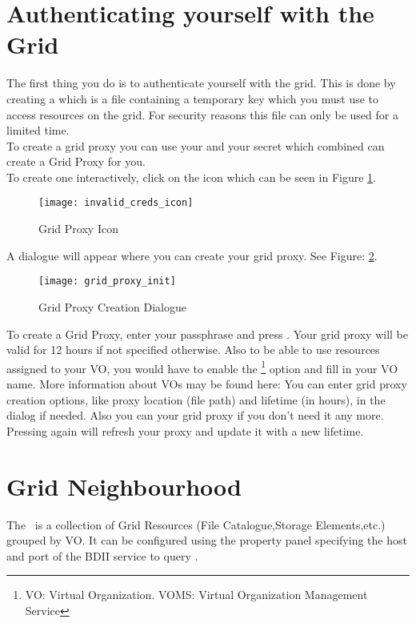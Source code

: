  \section{Authenticating yourself with the Grid} 
 \label{section:auth}

The first thing you do is to authenticate yourself with the grid. This is done
by creating a  which is a file containing a temporary key which
you must use to access resources on the grid. 
For security reasons this file can only be used for a limited time. \\
To create a grid proxy you can use your  and your secret
 which combined can create a Grid Proxy for you. \\
To create one interactively,  click on the  icon which can be seen in
Figure \ref{fig:grid_proxy_icon}. 

 \begin{figure}[htbp]
  \centerline{\texttt{[image: invalid\_creds\_icon]}}
  \caption{Grid Proxy Icon}
  \label{fig:grid_proxy_icon}
 \end{figure}

A dialogue will appear where you can create your grid proxy. See Figure: 
\ref{fig:grid_proxy_init_dialog}. 

 \begin{figure}[htbp]
  \centerline{\texttt{[image: grid\_proxy\_init]}}
  \caption{Grid Proxy Creation Dialogue}
  \label{fig:grid_proxy_init_dialog}
 \end{figure}

To create a Grid Proxy, enter your passphrase and press . Your
grid proxy will be valid for 12 hours if not specified otherwise. Also to be 
able to use resources assigned to your VO, you would have to enable the 
\footnote{VO: Virtual Organization. VOMS: Virtual Organization 
Management Service} option and fill in your VO name. More information about 
VOs may be found here: \cite{foster:2001:grid-anatomy,springerlink:10.1007/978-3-540-24689-3_5}
You can enter grid proxy creation options, like proxy location (file path) and
lifetime (in hours), in the dialog if needed. Also you can  
your grid proxy if you don't need it any more. Pressing  again will 
refresh your proxy and update it with a new lifetime.\\

\section{Grid Neighbourhood}
\label{section:grid_hood}
 The \GridHood\ is a collection of Grid Resources (File Catalogue,Storage Elements,etc.) 
 grouped by VO. It can be configured using the property panel specifying the host and port of the BDII 
 service to query \cite{cite:bdii,cite:gridinfo}. 

